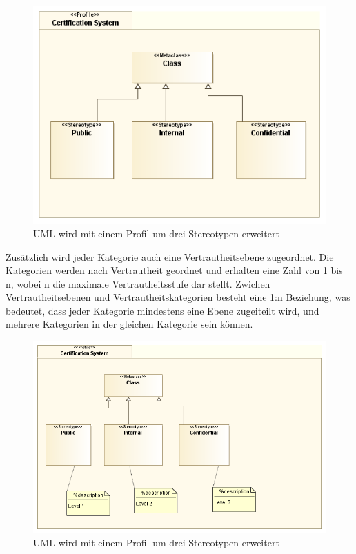 \begin{figure}[!htbp]
    \centering
    \includegraphics[scale=0.5]{uml/datastereotypes.png}
    \caption{UML wird mit einem Profil um drei Stereotypen erweitert}
\end{figure}

Zusätzlich wird jeder Kategorie auch eine Vertrautheitsebene zugeordnet. Die Kategorien werden nach Vertrautheit geordnet und erhalten eine Zahl von 1 bis n, wobei n die maximale Vertrautheitsstufe dar stellt. Zwichen Vertrautheitsebenen und Vertrautheitskategorien besteht eine 1:n Beziehung, was bedeutet, dass jeder Kategorie mindestens eine Ebene zugeiteilt wird, und mehrere Kategorien in der gleichen Kategorie sein können.

\begin{figure}[!htbp]
    \centering
    \includegraphics[scale=0.5]{uml/datastereotypesleve.png}
    \caption{UML wird mit einem Profil um drei Stereotypen erweitert}
\end{figure}


